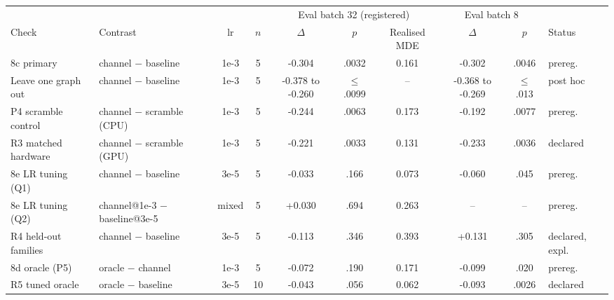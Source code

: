 \begin{tabular}{llcccccccl}
\toprule
 & & & & \multicolumn{3}{c}{Eval batch 32 (registered)} & \multicolumn{2}{c}{Eval batch 8} & \\
\cmidrule(lr){5-7}\cmidrule(lr){8-9}
Check & Contrast & lr & $n$ & $\Delta$ & $p$ & Realised MDE & $\Delta$ & $p$ & Status \\
\midrule
8c primary & channel $-$ baseline & 1e-3 & 5 & -0.304 & .0032 & 0.161 & -0.302 & .0046 & prereg. \\
Leave one graph out & channel $-$ baseline & 1e-3 & 5 & -0.378 to -0.260 & $\le$.0099 & -- & -0.368 to -0.269 & $\le$.013 & post hoc \\
P4 scramble control & channel $-$ scramble (CPU) & 1e-3 & 5 & -0.244 & .0063 & 0.173 & -0.192 & .0077 & prereg. \\
R3 matched hardware & channel $-$ scramble (GPU) & 1e-3 & 5 & -0.221 & .0033 & 0.131 & -0.233 & .0036 & declared \\
8e LR tuning (Q1) & channel $-$ baseline & 3e-5 & 5 & -0.033 & .166 & 0.073 & -0.060 & .045 & prereg. \\
8e LR tuning (Q2) & channel@1e-3 $-$ baseline@3e-5 & mixed & 5 & +0.030 & .694 & 0.263 & -- & -- & prereg. \\
R4 held-out families & channel $-$ baseline & 3e-5 & 5 & -0.113 & .346 & 0.393 & +0.131 & .305 & declared, expl. \\
8d oracle (P5) & oracle $-$ channel & 1e-3 & 5 & -0.072 & .190 & 0.171 & -0.099 & .020 & prereg. \\
R5 tuned oracle & oracle $-$ baseline & 3e-5 & 10 & -0.043 & .056 & 0.062 & -0.093 & .0026 & declared \\
\bottomrule
\end{tabular}
